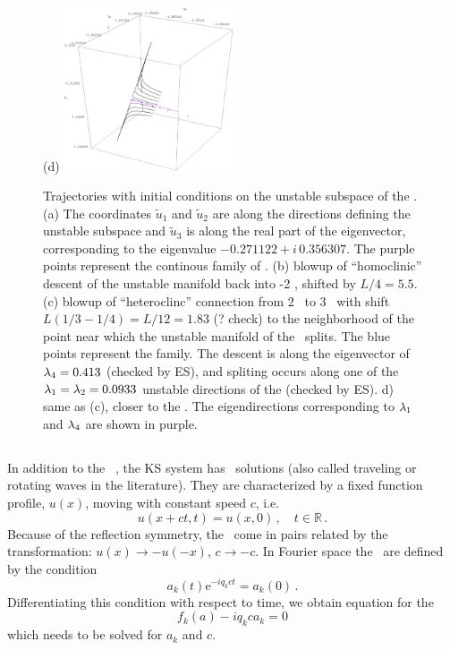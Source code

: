 \begin{figure}[h]
\hspace{0.1in}
(d)  \includegraphics[width=5.0cm]{figs/L22-2w-3w-detail.eps}
\caption{
 Trajectories with initial conditions on the unstable subspace of
 the  {\eqva}.
 (a) The coordinates $\tilde{u}_1$ and $\tilde{u}_2$ are along the directions defining the unstable subspace
 and $\tilde{u}_3$  is along the real part of the eigenvector,
 corresponding to the eigenvalue $-0.271122+ i\, 0.356307$. The purple points represent the continous family
 of
 \eqva.
(b) blowup of ``homoclinic'' descent of the unstable manifold
back into {\nameit}-2 {\eqv}, shifted by
$L/4 =5.5$.
(c) blowup of ``heteroclinc'' connection from
{\nameit}2 \eqv\ to {\nameit}3 \eqv\, with shift
$L(1/3-1/4) = L/12 = 1.83$ (? check)
to the neighborhood of the point near which the
unstable manifold of the
 \eqv\ splits. The blue points
represent the
 {\eqv} family.
The descent is along the eigenvector of $\lambda_4= 0.413$ (checked by ES),
and spliting
occurs along one of the
$\lambda_1=\lambda_2=0.0933$
unstable directions of the  {\eqv} (checked by ES).
d) same as (c), closer to the  {\eqv}. The eigendirections corresponding to $\lambda_1$
and $\lambda_4$ are shown in purple.
}
\label{f:neighborhood2w}
\end{figure}


\subsection{\Reqva}

In addition to the \eqva\ , the KS system has \reqv\ solutions
(also called traveling or rotating waves in the literature).
They are characterized by a fixed function profile, $u(x)$,
moving with constant speed $c$, i.e.
\[ u(x+ct,t) = u(x, 0)\,,\quad t \in \mathbb{R}\,.\]
Because of the reflection symmetry, the \reqva\ come in pairs
related by the transformation: $u(x) \to -u(-x)$, $c \to -c$.
In Fourier space the \reqva\ are defined by the condition
\[ a_k(t)\mathrm{e}^{-iq_kct} = a_k(0)\,.\]
Differentiating this condition with respect to time, we obtain
equation for the \reqv\
\[ f_k(a) - i q_k c a_k = 0 \]
which needs to be solved for $a_k$ and $c$.

